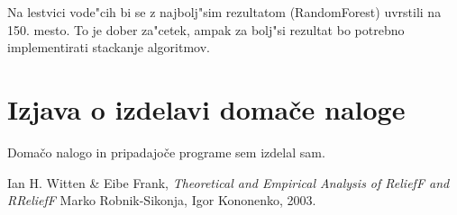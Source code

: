 \documentclass[a4paper,11pt]{article}
\begin{document}
Na lestvici vode"cih bi se z najbolj"sim rezultatom (RandomForest) uvrstili na 150. mesto. To je dober za"cetek, ampak za bolj"si rezultat bo potrebno implementirati stackanje algoritmov. 

\section{Izjava o izdelavi domače naloge}
Domačo nalogo in pripadajoče programe sem izdelal sam.


\begin{thebibliography}{9}

   Ian H. Witten \& Eibe Frank,
   \emph{Theoretical and Empirical Analysis of ReliefF and RReliefF}
   Marko Robnik-Sikonja, Igor Kononenko,
   2003.

\end{thebibliography}
\end{document}
